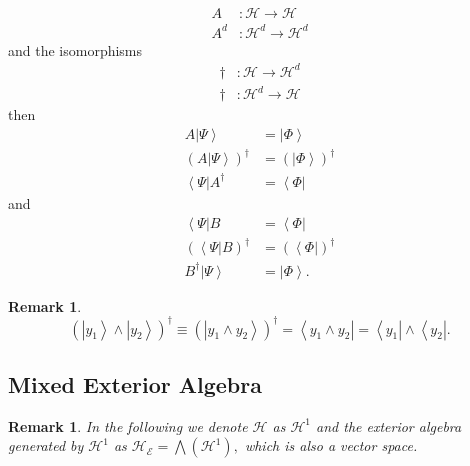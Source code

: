 \documentclass[aps,preprint]{revtex4}%
\newtheorem{remark}[theorem]{Remark}
\begin{document}
%

\begin{align}
A  &  :\mathcal{H}\rightarrow\mathcal{H}\\
A^{d}  &  :\mathcal{H}^{d}\rightarrow\mathcal{H}^{d}%
\end{align}
and the isomorphisms
\begin{align}
\dagger &  :\mathcal{H}\rightarrow\mathcal{H}^{d}\\
\dagger &  :\mathcal{H}^{d}\rightarrow\mathcal{H}%
\end{align}
then
\begin{align}
A\left\vert \Psi\right\rangle  &  =\left\vert \Phi\right\rangle \\
\left(  A\left\vert \Psi\right\rangle \right)  ^{\dagger}  &  =\left(
\left\vert \Phi\right\rangle \right)  ^{\dagger}\\
\left\langle \Psi\right\vert A^{\dagger}  &  =\left\langle \Phi\right\vert
\end{align}
and%
\begin{align}
\left\langle \Psi\right\vert B  &  =\left\langle \Phi\right\vert \\
\left(  \left\langle \Psi\right\vert B\right)  ^{\dagger}  &  =\left(
\left\langle \Phi\right\vert \right)  ^{\dagger}\\
B^{\dagger}\left\vert \Psi\right\rangle  &  =\left\vert \Phi\right\rangle .
\end{align}


\begin{remark}%
\begin{equation}
\left(  \left\vert y_{1}\right\rangle \wedge\left\vert y_{2}\right\rangle
\right)  ^{\dagger}\equiv\left(  \left\vert y_{1}\wedge y_{2}\right\rangle
\right)  ^{\dagger}=\left\langle y_{1}\wedge y_{2}\right\vert =\left\langle
y_{1}\right\vert \wedge\left\langle y_{2}\right\vert .
\end{equation}

\end{remark}

\subsection{Mixed Exterior Algebra}

\begin{remark}
In the following we denote $\mathcal{H}$ as $\mathcal{H}^{1}$ and the exterior
algebra generated by $\mathcal{H}^{1}$ as $\mathcal{H}_{\mathcal{E}}=%
{\textstyle\bigwedge}
\left(  \mathcal{H}^{1}\right)  ,$ which is also a vector space.
\end{remark}
\end{document}
